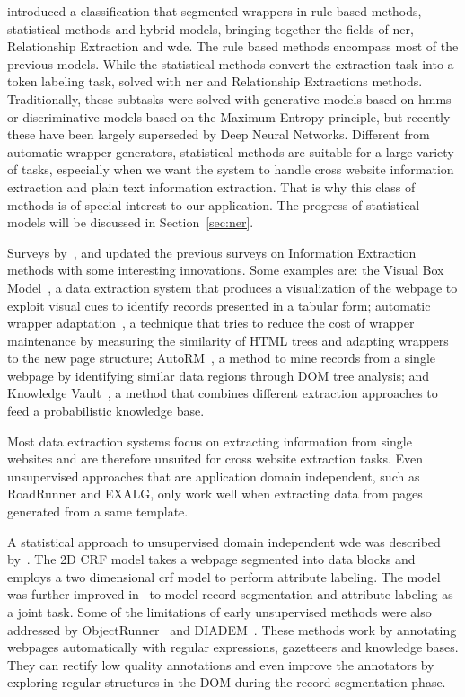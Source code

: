 \documentclass{nle}
\begin{document}
\cite{Sarawagi2008} introduced a classification that segmented wrappers in
rule-based methods, statistical methods and hybrid models, bringing together 
the fields of \gls{ner}, Relationship Extraction and \gls{wde}. 
The rule based methods encompass most of the previous models. While the statistical methods 
convert the extraction task into a token labeling task, solved with \gls{ner} 
and Relationship Extractions methods. Traditionally, these subtasks were solved with 
generative models based on \gls{hmm}s or discriminative models based on the 
Maximum Entropy principle, but recently these have been largely superseded by Deep Neural 
Networks. Different from automatic wrapper generators, statistical methods are suitable for
a large variety of tasks, especially when we want the system to handle cross website information 
extraction and plain text information extraction. That is why this class of methods is of 
special interest to our application. The progress of statistical models will be 
discussed in Section~\ref{sec:ner}.

Surveys by~\cite{Ferrara2014}, \cite{Schulz2016} and \cite{Varlamov2016} updated the 
previous surveys on Information Extraction methods with some interesting innovations. 
Some examples are: the Visual Box Model~\cite{Krupl2005}, a data extraction system that produces 
a visualization of the webpage to exploit visual cues to identify records presented in a tabular form;
automatic wrapper adaptation~\cite{Ferrara2011}, a technique that tries to reduce the cost of 
wrapper maintenance by measuring the similarity of HTML trees and adapting
wrappers to the new page structure; AutoRM~\cite{Shi2015}, a method to mine
records from a single webpage by identifying similar data regions through DOM
tree analysis; and Knowledge Vault~\cite{Dong2014}, a method that combines different 
extraction approaches to feed a probabilistic knowledge base.

Most data extraction systems focus on extracting information from single websites
and are therefore unsuited for cross website extraction tasks. Even unsupervised
approaches that are application domain independent, such as RoadRunner and EXALG, 
only work well when extracting data from pages generated from a same template. 

A statistical approach to unsupervised domain 
independent \gls{wde} was described by~\cite{Zhu2005}. The 2D CRF 
model takes a webpage segmented into data blocks and employs a two dimensional \gls{crf}
model to perform attribute labeling. The model was further improved 
in~\cite{Zhu2006} to model record segmentation and attribute labeling as a joint task.
Some of the limitations of early unsupervised methods 
were also addressed by ObjectRunner~\cite{Abdessalem2010} and DIADEM~\cite{Furche2012}. 
These methods work by annotating webpages automatically with regular expressions, gazetteers and 
knowledge bases. They can rectify low quality annotations and even improve the annotators
by exploring regular structures in the DOM during the record segmentation phase.
\end{document}

